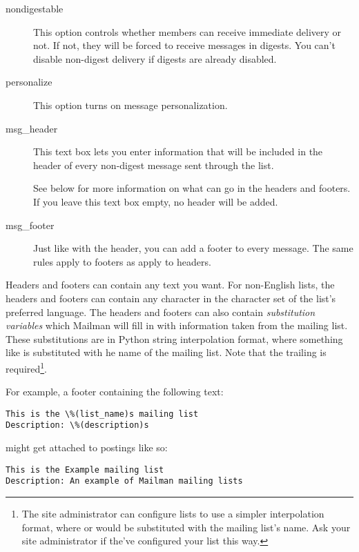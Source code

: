 \documentclass{howto}
\begin{document}
\begin{description}
\item[nondigestable]
    This option controls whether members can receive immediate
    delivery or not.  If not, they will be forced to receive messages
    in digests.  You can't disable non-digest delivery if digests are
    already disabled.

\item[personalize]
    This option turns on message personalization.

\item[msg_header]
    This text box lets you enter information that will be included in
    the header of every non-digest message sent through the
    list.

    See below for more information on what can go in the headers and
    footers.  If you leave this text box empty, no header will be
    added.

\item[msg_footer]
    Just like with the header, you can add a footer to every message.
    The same rules apply to footers as apply to headers.
\end{description}

Headers and footers can contain any text you want.  For non-English
lists, the headers and footers can contain any character in the
character set of the list's preferred language.  The headers and
footers can also contain \emph{substitution variables} which Mailman
will fill in with information taken from the mailing list.  These
substitutions are in Python string interpolation format, where
something like  is substituted with he name of
the mailing list.  Note that the trailing  is
required\footnote{The site administrator can configure lists to use a
simpler interpolation format, where  or
 would be substituted with the mailing list's
name.  Ask your site administrator if the've configured your list this
way.}.

For example, a footer containing the following text:

\begin{verbatim}
This is the \%(list_name)s mailing list
Description: \%(description)s
\end{verbatim}

might get attached to postings like so:

\begin{verbatim}
This is the Example mailing list
Description: An example of Mailman mailing lists
\end{verbatim}
\end{document}
